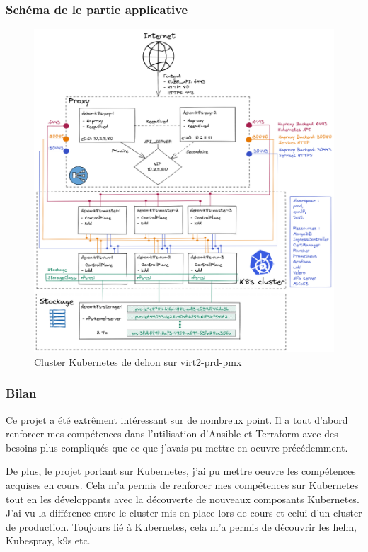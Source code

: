 \documentclass[12pt]{article}
\begin{document}
\subsubsection{Schéma de le partie applicative}
\begin{figure}[!ht]
    \centering
        \includegraphics[width=\textwidth]{src/graph_dehon2.png}
    \caption{Cluster \gls{Kubernetes} de dehon sur virt2-prd-pmx}
    \label{fig:graph_dehon2}
\end{figure}

\subsubsection{Bilan}
Ce projet a été extrêment intéressant sur de nombreux point.
Il a tout d'abord renforcer mes compétences dans l'utilisation d'\gls{Ansible} et Terraform avec des besoins plus compliqués que ce que j'avais pu mettre en oeuvre précédemment.

De plus, le projet portant sur \gls{Kubernetes}, j'ai pu mettre oeuvre les compétences acquises en cours. 
Cela m'a permis de renforcer mes compétences sur \gls{Kubernetes} tout en les développants avec la découverte de nouveaux composants \gls{Kubernetes}.
J'ai vu la différence entre le \gls{cluster} mis en place lors de cours et celui d'un \gls{cluster} de production.
Toujours lié à \gls{Kubernetes}, cela m'a permis de découvrir les helm, \gls{Kubespray}, k9s etc.
\end{document}
